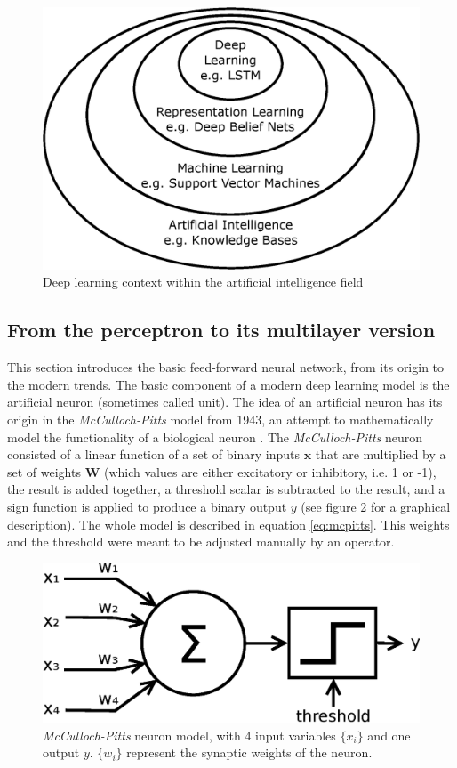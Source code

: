 \begin{figure}
	\centering
	\includegraphics[width=0.5\linewidth]{background/images/venn_DL}
	\caption[Deep learning \textit{Venn} diagram]{Deep learning context within the artificial intelligence field \autocite{Goodfellow2016}}
	\label{fig:venndl}
\end{figure}



\subsection{From the perceptron to its multilayer version} \label{sec:mlp}

This section introduces the basic feed-forward neural network, from its origin to the modern trends. The basic component of a modern deep learning model is the artificial neuron (sometimes called unit). The idea of an artificial neuron has its origin in the \textit{McCulloch-Pitts} model from 1943, an attempt to mathematically model the functionality of a biological neuron \autocite{mccullochPitts1943}. The \textit{McCulloch-Pitts} neuron consisted of a linear function of a set of binary inputs $\mathbf{x}$ that are multiplied by a set of weights $\mathbf{W}$ (which values are either excitatory or inhibitory, i.e. 1 or -1), the result is added together, a threshold scalar is subtracted to the result, and a sign function is applied to produce a binary output $y$ (see figure \ref{fig:mcpittsneuron} for a graphical description). The whole model is described in equation \ref{eq:mcpitts}. This weights and the threshold were meant to be adjusted manually by an operator.

\begin{figure}
	\centering
	\includegraphics[width=0.60\linewidth]{background/images/mcpittsneuron}
	\caption[\textit{McCulloch-Pitts} neuron model]{\textit{McCulloch-Pitts} neuron model, with 4 input variables $\{x_i\}$ and one output $y$. $\{w_i\}$ represent the synaptic weights of the neuron.}
	\label{fig:mcpittsneuron}
\end{figure}

